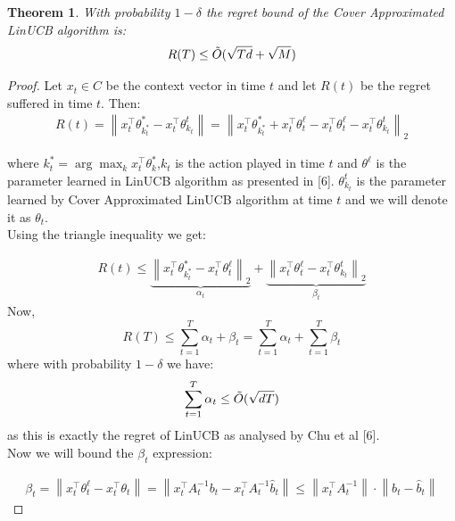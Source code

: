 \documentclass{article}
\newcommand{\norm}[1]{\left\lVert#1\right\rVert}
\newtheorem{theorem}{Theorem}[section]
\begin{document}
\begin{theorem}
With probability $1-\delta$ the regret bound of the Cover Approximated LinUCB algorithm is:
$$ R(T) \leq  \Tilde{O}(\sqrt{Td} + \sqrt{M}) $$
\end{theorem}


\begin{proof}
Let $x_t \in C$ be the context vector in time $t$ and let $R(t)$ be the regret suffered in time $t$. Then:
\begin{equation}
    \begin{split}
        R(t) = \norm{x^\top_t \theta^*_{k^*_t} - x^\top_t \theta^ t _{k_t}} = \norm{x^\top_t\theta^*_{k^*_t} + x^\top_t \theta^ \ell _t - x^\top_t \theta^ \ell _t - x^\top_t \theta^t _{k_t}}_2
    \end{split}
\end{equation}

where $k^*_t = \arg \max _k {x^\top_t \theta _k ^*}$,$k_t$ is the action played in time $t$ and $\theta ^ \ell$ is the parameter learned in LinUCB algorithm as presented in [6].  $\theta^t _{k_t}$ is the parameter learned by Cover Approximated LinUCB algorithm at time $t$ and we will denote it as $\theta _t$.\\
Using the triangle inequality we get:

\begin{equation}
    \begin{split}
        R(t) \leq \underbrace{ \norm{x^\top_t\theta^*_{k^*_t}  - x^\top_t \theta^ \ell _t }_2}_{\alpha_t} + \underbrace{ \norm{x^\top_t \theta^ \ell _t - x^\top_t \theta^t _{k_t}}_2}_{\beta_t}
    \end{split}
\end{equation}
Now, 
\begin{equation}
   R(T) \leq \sum_{t=1}^T \alpha_t + \beta_t = \sum_{t=1}^T \alpha_t + \sum_{t=1}^T \beta_t
\end{equation}
where with probability $1-\delta$ we have:
\begin{equation}
    \sum_{t=1}^T \alpha_t \leq \Tilde{O}(\sqrt{dT})
\end{equation}
as this is exactly the regret of LinUCB as analysed by Chu et al [6].\\
Now we will bound the $\beta_t$ expression:

\begin{equation}
    \begin{split}
        \beta_t = \norm{x_t ^\top \theta_t^\ell - x_t^\top \theta_t} = \norm{x_t ^\top A^{-1}_t b_t - x_t ^\top A^{-1}_t \hat{b}_t} \leq \norm{x_t ^\top A^{-1} _t}\cdot\norm{b_t-\hat{b}_t}
    \end{split}
\end{equation}


\end{proof}
\end{document}
